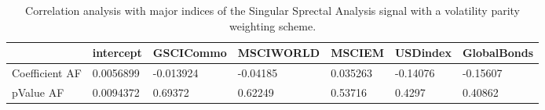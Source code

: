 \begin{table}[H]
\centering
\begin{tabular}{lllllll}
& intercept & GSCICommo & MSCIWORLD & MSCIEM & USDindex & GlobalBonds \\ 
\hline 
Coefficient AF & 0.0056899 & -0.013924 & -0.04185 & 0.035263 & -0.14076 & -0.15607 \\ 
pValue AF & 0.0094372 & 0.69372 & 0.62249 & 0.53716 & 0.4297 & 0.40862 \\ 
\hline
\end{tabular}
\caption{Correlation analysis with major indices of the Singular Sprectal Analysis signal with a volatility parity weighting scheme.}
\label{SSA_AFACTOR}
\end{table}